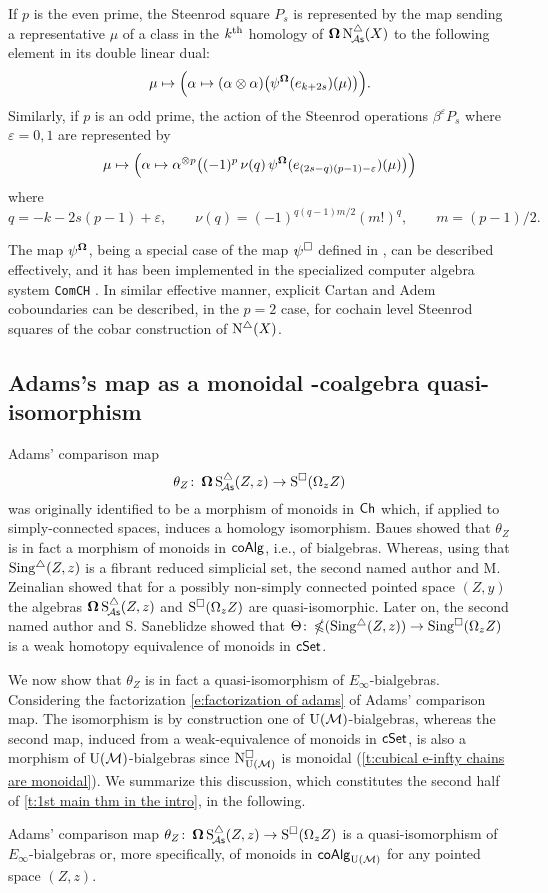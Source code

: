 If $p$ is the even prime, the Steenrod square $P_s$ is represented by the map sending a representative $\mu$ of a class in the $k^{\mathrm{th}}$ homology of $\operatorname{\mathbf{\Omega}} \operatorname{N^{\triangle}_{\!{\mathcal{A}\mathsf{s}}}}(X)$ to the following element in its double linear dual:
\[
\mu \mapsto
\Big( \alpha \mapsto (\alpha \otimes \alpha) \big( \psi^{\operatorname{\mathbf{\Omega}}}(e_{k+2s})(\mu) \big) \Big).
\]
Similarly, if $p$ is an odd prime, the action of the Steenrod operations $\beta^\varepsilon P_{s}$ where $\varepsilon = 0,1$ are represented by
\[
\mu \mapsto
\Big( \alpha \mapsto \alpha^{\otimes p} \big( (-1)^p \, \nu(q) \, \psi^{\operatorname{\mathbf{\Omega}}}(e_{(2s-q)(p-1)-\varepsilon})(\mu) \big) \Big)
\]
where
\[
q = -k -2s(p-1) + \varepsilon, \qquad
\nu(q) = (-1)^{q(q-1)m/2}(m!)^q, \qquad
m = (p-1)/2.
\]

The map $\psi^{\operatorname{\mathbf{\Omega}}}$, being a special case of the map $\psi^\square$ defined in \cite{medina2021may_st}, can be described effectively, and it has been implemented in the specialized computer algebra system \texttt{ComCH} \cite{medina2021comch}.
In similar effective manner, explicit Cartan and Adem coboundaries \cite{medina2020cartan, medina2021adem} can be described, in the $p = 2$ case, for cochain level Steenrod squares of the cobar construction of $\operatorname{N^{\triangle}}(X)$.


\subsection{Adams's map as a monoidal \pdfEinfty-coalgebra quasi-isomorphism}

Adams' comparison map
\[
\theta_Z \colon \operatorname{\mathbf{\Omega}} \operatorname{S^{\triangle}_{\!{\mathcal{A}\mathsf{s}}}}(Z,z) \to \operatorname{S^{\square}}(\Omega_z Z)
\]
was originally identified to be a morphism of monoids in $\mathsf{Ch}$ which, if applied to simply-connected spaces, induces a homology isomorphism.
Baues showed that $\theta_Z$ is in fact a morphism of monoids in $\mathsf{coAlg}$, i.e., of bialgebras.
Whereas, using that $\operatorname{Sing^{\triangle}}(Z,z)$ is a fibrant reduced simplicial set, the second named author and M. Zeinalian \cite{rivera2018cubical} showed that for a possibly non-simply connected pointed space $(Z,y)$ the algebras $\operatorname{\mathbf{\Omega}} \operatorname{S^{\triangle}_{\!{\mathcal{A}\mathsf{s}}}}(Z,z)$ and $\operatorname{S^{\square}}(\Omega_zZ)$ are quasi-isomorphic.
Later on, the second named author and S. Saneblidze
\cite{rivera2019path} showed that $\Theta \colon \operatorname{\mathbb{\Omega}}(\operatorname{Sing^{\triangle}}(Z,z)) \to \operatorname{Sing^{\square}}(\Omega_z Z)$ is a weak homotopy equivalence of monoids in $\mathsf{cSet}$.

We now show that $\theta_Z$ is in fact a quasi-isomorphism of $E_{\infty}$-bialgebras.
Considering the factorization \eqref{e:factorization of adams} of Adams' comparison map.
The isomorphism is by construction one of ${\operatorname{U}(\mathcal{M})}$-bialgebras, whereas the second map, induced from a weak-equivalence of monoids in $\mathsf{cSet}$, is also a morphism of ${\operatorname{U}(\mathcal{M})}$-bialgebras
since $\operatorname{N^{\square}_{{\operatorname{U}(\mathcal{M})}}}$ is monoidal (\cref{t:cubical e-infty chains are monoidal}).
We summarize this discussion, which constitutes the second half of \cref{t:1st main thm in the intro}, in the following.

\begin{lemma}\label{l:adams comparison is an e-infty bialgebra map}
	Adams' comparison map $\theta_Z \colon \operatorname{\mathbf{\Omega}} \operatorname{S^{\triangle}_{\!{\mathcal{A}\mathsf{s}}}}(Z,z) \to \operatorname{S^{\square}}(\Omega_z Z)$ is a quasi-isomorphism of $E_{\infty}$-bialgebras or, more specifically, of monoids in $\mathsf{coAlg}_{\operatorname{U}(\mathcal{M})}$ for any pointed space $(Z,z)$.
\end{lemma}